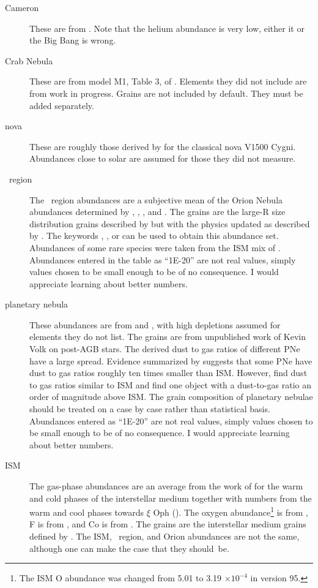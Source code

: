 \begin{description}
\item[Cameron] These are from \citet{Cameron1982}.
Note that the helium abundance
is very low, either it or the Big Bang is wrong.

\item[Crab Nebula]
These are from model M1, Table 3, of \citet{PequignotDennefeld1983}.
Elements they did not include are from work in progress.
Grains are not included by default.
They must be added separately.

\item[nova] These are roughly those derived by
\citet{Ferland1978} for
the classical nova V1500 Cygni.
Abundances close to solar are assumed for
those they did not measure.

\item[\hii\ region] The \hii\ region abundances are a
subjective mean of the Orion
Nebula abundances determined by \citet{Baldwin1991},
\citet{Rubin1991},
\citet{Osterbrock1992}, and \citet{Rubin1993}.
The grains are the
large-R size distribution grains described by
\citet{Baldwin1991} but
with the physics updated as described by \citet{VanHoof2004}.
The
keywords , ,
or  can be used to obtain this
abundance set.
Abundances of some rare species were taken from the ISM
mix of \citet{Savage1996}.
Abundances entered in the table as
``1E-20'' are not real values, simply values chosen to be small enough to
be of no consequence.
I would appreciate learning about better numbers.

\item[planetary nebula] These abundances are from \citet{Aller1983}
and \citet{Khromov1989}, with high depletions assumed for elements
they do not list.  The grains are from unpublished work of Kevin Volk
on post-AGB stars.  The derived dust to gas ratios of different PNe
have a large spread.  Evidence summarized by \citet{Clegg1989} suggests that some PNe have dust to gas ratios roughly ten
times smaller than ISM.  However, \citet{Mallik1988} find dust to gas
ratios similar to ISM and \citet{Borkowski1991} find one object with a
dust-to-gas ratio an order of magnitude above ISM.  The grain
composition of planetary nebulae should be treated on a case by case
rather than statistical basis.  Abundances entered as ``1E-20'' are
not real values, simply values chosen to be small enough to be of no
consequence.  I would appreciate learning about better numbers.

\item[ISM]  The gas-phase abundances are an average
from the work of \citet{Cowie1986} for the warm and cold phases of the interstellar medium
together with numbers from the warm and cool phases towards
$\xi$ Oph (\citealp{Savage1996}).
The oxygen abundance\footnote{The ISM
O abundance was changed from
5.01 to 3.19 $\times 10^{-4}$ in version 95.}
is from \citet{Meyer1998}, F is from 
\citet{SnowElAt_Fabund09},
and Co is from \citet{MullmanEtAl_CoAbund_98}.
The grains are the interstellar medium grains defined by
\citet{Mathis1977}.
The ISM, \hii\ region, and Orion abundances are not
the same, although one can make the case that they should~be.


\end{description}
